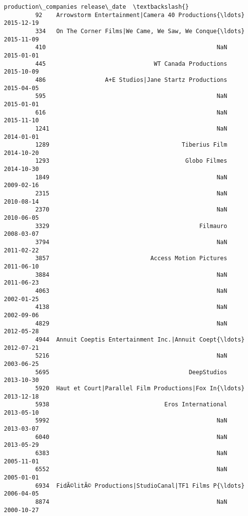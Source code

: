 \documentclass[11pt]{article}
\begin{document}
\begin{Verbatim}[commandchars=\\\{\}]
                                            production\_companies release\_date  \textbackslash{}
         92    Arrowstorm Entertainment|Camera 40 Productions{\ldots}   2015-12-19   
         334   On The Corner Films|We Came, We Saw, We Conque{\ldots}   2015-11-09   
         410                                                 NaN   2015-01-01   
         445                               WT Canada Productions   2015-10-09   
         486                 A+E Studios|Jane Startz Productions   2015-04-05   
         595                                                 NaN   2015-01-01   
         616                                                 NaN   2015-11-10   
         1241                                                NaN   2014-01-01   
         1289                                      Tiberius Film   2014-10-20   
         1293                                       Globo Filmes   2014-10-30   
         1849                                                NaN   2009-02-16   
         2315                                                NaN   2010-08-14   
         2370                                                NaN   2010-06-05   
         3329                                           Filmauro   2008-03-07   
         3794                                                NaN   2011-02-22   
         3857                             Access Motion Pictures   2011-06-10   
         3884                                                NaN   2011-06-23   
         4063                                                NaN   2002-01-25   
         4138                                                NaN   2002-09-06   
         4829                                                NaN   2012-05-28   
         4944  Annuit Coeptis Entertainment Inc.|Annuit Coept{\ldots}   2012-07-21   
         5216                                                NaN   2003-06-25   
         5695                                        DeepStudios   2013-10-30   
         5920  Haut et Court|Parallel Film Productions|Fox In{\ldots}   2013-12-18   
         5938                                 Eros International   2013-05-10   
         5992                                                NaN   2013-03-07   
         6040                                                NaN   2013-05-29   
         6383                                                NaN   2005-11-01   
         6552                                                NaN   2005-01-01   
         6934  FidÃ©litÃ© Productions|StudioCanal|TF1 Films P{\ldots}   2006-04-05   
         8874                                                NaN   2000-10-27   
         

\end{Verbatim}
\end{document}
